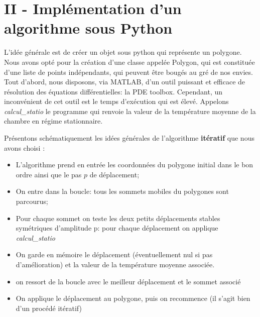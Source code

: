 \documentclass[a4paper,reqno]{article}
\newcommand{\pa}{\hspace{0.5cm}}
\begin{document}
\newpage

\section*{II - Implémentation d'un algorithme sous Python} 
\pa L'idée générale est de créer un objet sous python qui représente un polygone. Nous avons opté pour la création d'une classe appelée Polygon, qui est constituée d'une liste de points indépendants, qui peuvent être bougés au gré de nos envies. 
\\
Tout d'abord, nous disposons, via MATLAB, d'un outil puissant et efficace de résolution des équations différentielles: la PDE toolbox. Cependant, un inconvénient de cet outil est le temps d'exécution qui est élevé. Appelons \textit{calcul\_statio} le programme qui renvoie la valeur de la température moyenne de la chambre en régime stationnaire.

\par Présentons schématiquement les idées générales de l'algorithme \textbf{itératif} que nous avons choisi : \vspace{0.3cm}

\begin{itemize}
  \item L'algorithme prend en entrée les coordonnées du polygone initial dans le bon ordre ainsi que le pas $p$ de déplacement;
  \item On entre dans la boucle: tous les sommets mobiles du polygones sont parcourus;
  \item Pour chaque sommet on teste les deux petits déplacements stables symétriques d'amplitude p: pour chaque déplacement on applique \textit{calcul\_statio}
  \item On garde en mémoire le déplacement (éventuellement nul si pas d'amélioration) et la valeur de la température moyenne associée. 
  \item on ressort de la boucle avec le meilleur déplacement et le sommet associé
  \item On applique le déplacement au polygone, puis on recommence (il s'agit bien d'un procédé itératif)
\end{itemize}
\vspace{0.3cm}


\par 
\end{document}
